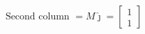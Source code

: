\documentclass[preview]{standalone}
\begin{document}
\begin{align*}
\text{Second column } = M\hat{\jmath} = \begin{bmatrix} 1 \\ 1 \end{bmatrix}
\end{align*}
\end{document}
